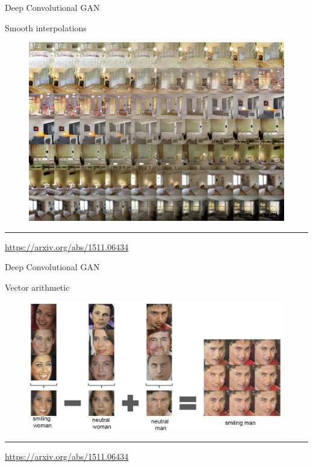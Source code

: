 \documentclass{beamer}
\begin{document}
\begin{frame}{Deep Convolutional GAN}
	\begin{block}{Smooth interpolations}
		\begin{figure}
			\centering
			\includegraphics[width=0.8\linewidth]{figs/dcgan_results_2}
		\end{figure}
	\end{block}
	\vfill
	\hrule\medskip
	{\scriptsize \href{https://arxiv.org/abs/1511.06434}{https://arxiv.org/abs/1511.06434}}
\end{frame}
\begin{frame}{Deep Convolutional GAN}
	\begin{block}{Vector arithmetic}
		\begin{figure}
			\centering
			\includegraphics[width=1.0\linewidth]{figs/dcgan_results_3}
		\end{figure}
	\end{block}
	\vfill
	\hrule\medskip
	{\scriptsize \href{https://arxiv.org/abs/1511.06434}{https://arxiv.org/abs/1511.06434}}
\end{frame}
\end{document}
